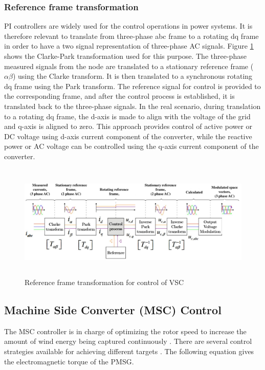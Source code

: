 \subsubsection{Reference frame transformation}\label{ref_frame_trafo}
\gls{PI} controllers are widely used for the control operations in power systems. It is therefore relevant to translate from three-phase abc frame to a rotating \gls{dq} frame in order to have a two signal representation of three-phase \gls{AC} signals. Figure \ref{fig:DQTransformation} shows the Clarke-Park transformation used for this purpose. The three-phase measured signals from the node are translated to a stationary reference frame ($\alpha \beta$) using the Clarke transform. It is then translated to a synchronous rotating \gls{dq} frame using the Park transform. The reference signal for control is provided to the corresponding frame, and after the control process is established, it is translated back to the three-phase signals. In the real scenario, during translation to a rotating \gls{dq} frame, the d-axis is made to align with the voltage of the grid and q-axis is aligned to zero. This approach provides control of active power or \gls{DC} voltage using d-axis current component of the converter, while the reactive power or \gls{AC} voltage can be controlled using the q-axis current component of the converter.   

\begin{figure}[H]
\centering
    \includegraphics[height = 5.5cm,width = 15.5cm]{Diagrams/Chapter_2/DQTransformation.pdf}
    \caption{Reference frame transformation for control of VSC \cite{ndreko2017offshore}}
    \label{fig:DQTransformation}
\end{figure}

\subsection{Machine Side Converter (MSC) Control}
The \gls{MSC} controller is in charge of optimizing the rotor speed to increase the amount of wind energy being captured continuously \cite{strachan_stability_2010}. There are several control strategies available for achieving different targets \cite{bose_power_2006}. The following equation gives the electromagnetic torque of the \gls{PMSG}.

